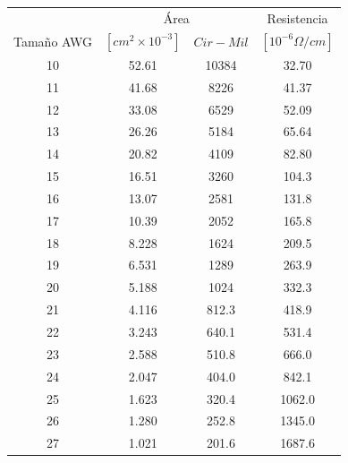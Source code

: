 \begin{table}[H]
    \centering
    \begin{tabular}{cccc}
        \hline
                & \multicolumn{2}{c}{Área}          & Resistencia          \\ \cline{2-4} 
        Tamaño AWG & $[cm^2\times10^{-3}]$ & $Cir-Mil$ & $[10^{-6}\Omega/cm]$ \\ \hline
        10         & 52.61                 & 10384     & 32.70                \\
        11         & 41.68                 & 8226      & 41.37                \\
        12         & 33.08                 & 6529      & 52.09                \\
        13         & 26.26                 & 5184      & 65.64                \\
        14         & 20.82                 & 4109      & 82.80                \\
        15         & 16.51                 & 3260      & 104.3                \\
        16         & 13.07                 & 2581      & 131.8                \\
        17         & 10.39                 & 2052      & 165.8                \\
        18         & 8.228                 & 1624      & 209.5                \\
        19         & 6.531                 & 1289      & 263.9                \\
        20         & 5.188                 & 1024      & 332.3                \\
        21         & 4.116                 & 812.3     & 418.9                \\
        22         & 3.243                 & 640.1     & 531.4                \\
        23         & 2.588                 & 510.8     & 666.0                \\
        24         & 2.047                 & 404.0     & 842.1                \\
        25         & 1.623                 & 320.4     & 1062.0               \\
        26         & 1.280                 & 252.8     & 1345.0               \\
        27         & 1.021                 & 201.6     & 1687.6               \\

\end{tabular}
\end{table}
